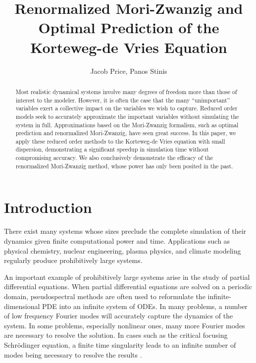 \documentclass{article}
\title{Renormalized Mori-Zwanzig and Optimal Prediction of the Korteweg-de Vries Equation}
\author{Jacob Price, Panos Stinis}
\begin{document}
\maketitle

\begin{abstract}
Most realistic dynamical systems involve many degrees of freedom more than those of interest to the modeler. However, it is often the case that the many ``unimportant'' variables exert a collective impact on the variables we wish to capture. Reduced order models seek to accurately approximate the important variables without simulating the system in full. Approximations based on the Mori-Zwanzig formalism, such as optimal prediction and renormalized Mori-Zwanzig, have seen great success. In this paper, we apply these reduced order methods to the Korteweg-de Vries equation with small dispersion, demonstrating a significant speedup in simulation time without compromising accuracy. We also conclusively demonstrate the efficacy of the renormalized Mori-Zwanzig method, whose power has only been posited in the past.
\end{abstract}

\section{Introduction}

There exist many systems whose sizes preclude the complete simulation of their dynamics given finite computational power and time. Applications such as physical chemistry, nuclear engineering, plasma physics, and climate modeling regularly produce prohibitively large systems.

An important example of prohibitively large systems arise in the study of partial differential equations. When partial differential equations are solved on a periodic domain, pseudospectral methods are often used to reformulate the infinite-dimensional PDE into an infinite system of ODEs. In many problems, a number of low frequency Fourier modes will accurately capture the dynamics of the system. In some problems, especially nonlinear ones, many more Fourier modes are necessary to resolve the solution. In cases such as the critical focusing Schr\"odinger equation, a finite time singularity leads to an infinite number of modes being necessary to resolve the results \cite{stinis2012numerical}.
\end{document}
